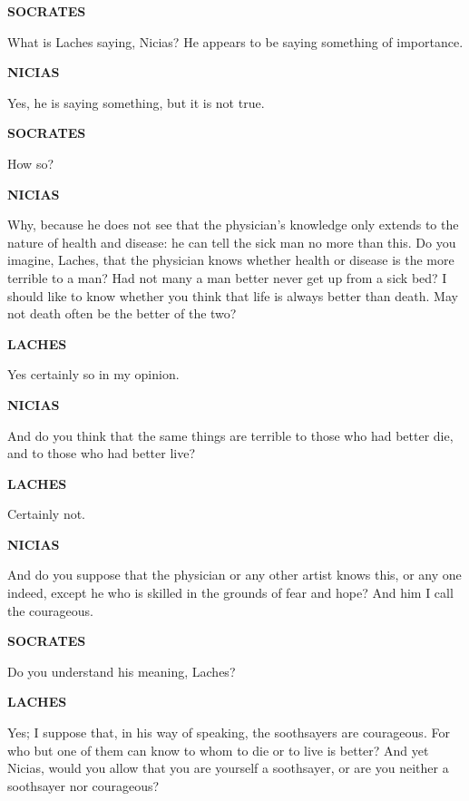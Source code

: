 \documentclass[11pt,letter]{article}
\begin{document}
\par \textbf{SOCRATES}
\par   What is Laches saying, Nicias? He appears to be saying something of importance.

\par \textbf{NICIAS}
\par   Yes, he is saying something, but it is not true.

\par \textbf{SOCRATES}
\par   How so?

\par \textbf{NICIAS}
\par   Why, because he does not see that the physician's knowledge only extends to the nature of health and disease:  he can tell the sick man no more than this. Do you imagine, Laches, that the physician knows whether health or disease is the more terrible to a man? Had not many a man better never get up from a sick bed? I should like to know whether you think that life is always better than death. May not death often be the better of the two?

\par \textbf{LACHES}
\par   Yes certainly so in my opinion.

\par \textbf{NICIAS}
\par   And do you think that the same things are terrible to those who had better die, and to those who had better live?

\par \textbf{LACHES}
\par   Certainly not.

\par \textbf{NICIAS}
\par   And do you suppose that the physician or any other artist knows this, or any one indeed, except he who is skilled in the grounds of fear and hope? And him I call the courageous.

\par \textbf{SOCRATES}
\par   Do you understand his meaning, Laches?

\par \textbf{LACHES}
\par   Yes; I suppose that, in his way of speaking, the soothsayers are courageous. For who but one of them can know to whom to die or to live is better? And yet Nicias, would you allow that you are yourself a soothsayer, or are you neither a soothsayer nor courageous?
\end{document}
